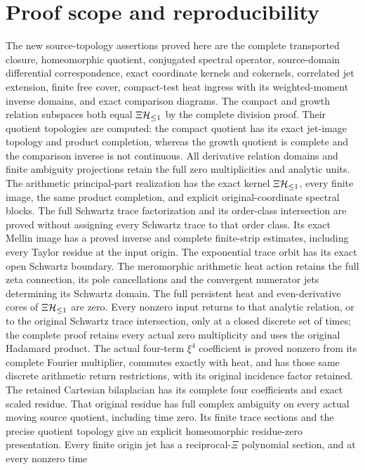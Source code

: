 \section{Proof scope and reproducibility}
The new source-topology assertions proved here are the complete
transported closure, homeomorphic quotient, conjugated spectral
operator, source-domain differential correspondence, exact coordinate
kernels and cokernels, correlated jet extension, finite free cover,
compact-test heat ingress with its weighted-moment inverse domains,
and exact comparison diagrams. The compact and growth relation
subspaces both equal $\Xi\mathcal H_{\leq 1}$ by the complete division proof.
Their quotient topologies are computed: the compact quotient has
its exact jet-image topology and product completion, whereas the
growth quotient is complete and the comparison inverse is not
continuous. All derivative relation domains and finite ambiguity
projections retain the full zero multiplicities and analytic units.
The arithmetic principal-part realization has the exact kernel
$\Xi\mathcal H_{\leq 1}$, every finite image, the same product completion,
and explicit original-coordinate spectral blocks. The full Schwartz
trace factorization and its order-class intersection are proved
without assigning every Schwartz trace to that order class.
Its exact Mellin image has a proved inverse and complete
finite-strip estimates, including every Taylor residue at the
input origin. The exponential trace orbit has its exact open
Schwartz boundary. The meromorphic arithmetic heat action
retains the full zeta connection, its pole cancellations and
the convergent numerator jets determining its Schwartz domain.
The full persistent heat and even-derivative cores of $\Xi\mathcal H_{\leq 1}$
are zero. Every nonzero input returns to that analytic relation,
or to the original Schwartz trace intersection, only at a closed
discrete set of times; the complete proof retains every actual
zero multiplicity and uses the original Hadamard product.
The actual four-term $\xi^4$ coefficient is proved nonzero
from its complete Fourier multiplier, commutes exactly with
heat, and has those same discrete arithmetic return restrictions,
with its original incidence factor retained.
The retained Cartesian bilaplacian has its complete four
coefficients and exact scaled residue. That original residue
has full complex ambiguity on every actual moving source
quotient, including time zero. Its finite trace sections and
the precise quotient topology give an explicit homeomorphic
residue-zero presentation. Every finite origin jet has a
reciprocal-$\Xi$ polynomial section, and at every nonzero time
